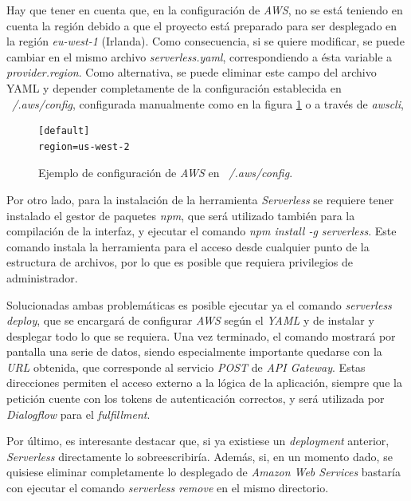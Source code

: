 \documentclass[11pt,spanish,listoffigures]{tfgetsinf}
\begin{document}
Hay que tener en cuenta que, en la configuración de \textit{AWS}, no se está teniendo en cuenta la región debido a que el proyecto está preparado para ser desplegado en la región \textit{eu-west-1} (Irlanda). Como consecuencia, si se quiere modificar, se puede cambiar en el mismo archivo \textit{serverless.yaml}, correspondiendo a ésta variable a \textit{provider.region}. Como alternativa, se puede eliminar este campo del archivo YAML y depender completamente de la configuración establecida en \textit{~/.aws/config}, configurada manualmente como en la figura \ref{fig:aws-config} o a través de \textit{awscli}, 

\begin{figure}[h!]
    \centering
    \begin{lstlisting}
[default]
region=us-west-2
    \end{lstlisting}
    \caption{Ejemplo de configuración de \textit{AWS} en \textit{~/.aws/config}.}
    \label{fig:aws-config}
\end{figure}

Por otro lado, para la instalación de la herramienta \textit{Serverless} se requiere tener instalado el gestor de paquetes \textit{npm}, que será utilizado también para la compilación de la interfaz, y ejecutar el comando \textit{npm install -g serverless}. Este comando instala la herramienta para el acceso desde cualquier punto de la estructura de archivos, por lo que es posible que requiera privilegios de administrador. 

Solucionadas ambas problemáticas es posible ejecutar ya el comando \textit{serverless deploy}, que se encargará de configurar \textit{AWS} según el \textit{YAML} y de instalar y desplegar todo lo que se requiera. Una vez terminado, el comando mostrará por pantalla una serie de datos, siendo especialmente importante quedarse con la \textit{URL} obtenida, que corresponde al servicio \textit{POST} de \textit{API Gateway}. Estas direcciones permiten el acceso externo a la lógica de la aplicación, siempre que la petición cuente con los tokens de autenticación correctos, y será utilizada por \textit{Dialogflow} para el \textit{fulfillment}.

Por último, es interesante destacar que, si ya existiese un \textit{deployment} anterior, \textit{Serverless} directamente lo sobreescribiría. Además, si, en un momento dado, se quisiese eliminar completamente lo desplegado de \textit{Amazon Web Services} bastaría con ejecutar el comando \textit{serverless remove} en el mismo directorio.
\end{document}
